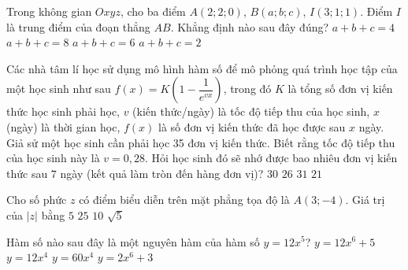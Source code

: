 \begin{ex}%
	Trong không gian $Oxyz$, cho ba điểm $A\left(2;2;0\right)$, $B\left(a;b;c\right)$, $ I\left(3;1;1\right)$. Điểm $ I$ là trung điểm của đoạn thẳng $ AB$. Khẳng định nào sau đây đúng?
	\choice
	{$ a+b+c=4$}
	{$ a+b+c=8$}
	{\True $ a+b+c=6$}
	{$ a+b+c=2$}
\end{ex}

\begin{ex}%
	Các nhà tâm lí học sử dụng mô hình hàm số để mô phỏng quá trình học tập của một học sinh như sau $f(x)=K\left(1-\dfrac{1}{e^{vx}}\right)$, trong đó $K$ là tổng số đơn vị kiến thức học sinh phải học, $v$ (kiến thức/ngày) là tốc độ tiếp thu của học sinh, $x$ (ngày) là thời gian học, $f(x)$ là số đơn vị kiến thức đã học được sau $x$ ngày. Giả sử một học sinh cần phải học 35 đơn vị kiến thức. Biết rằng tốc độ tiếp thu của học sinh này là $v=0{,}28$. Hỏi học sinh đó sẽ nhớ được bao nhiêu đơn vị kiến thức sau $7$ ngày (kết quả làm tròn đến hàng đơn vị)?
	\choice
	{\True $30$}
	{$26$}
	{$31$}
	{$21$}
\end{ex}

\begin{ex}%
	Cho số phức $z$ có điểm biểu diễn trên mặt phẳng tọa độ là $A(3;-4)$. Giá trị của $ |z|$ bằng
	\choice
	{\True $5$}
	{$25$}
	{$10$}
	{$\sqrt{5}$}
\end{ex}

\begin{ex}%
	Hàm số nào sau đây là một nguyên hàm của hàm số $y=12x^5$?
	\choice
	{$y=12x^6+5$}
	{$y=12x^4$}
	{$y=60x^4$}
	{\True $y=2x^6+3$}
\end{ex}


